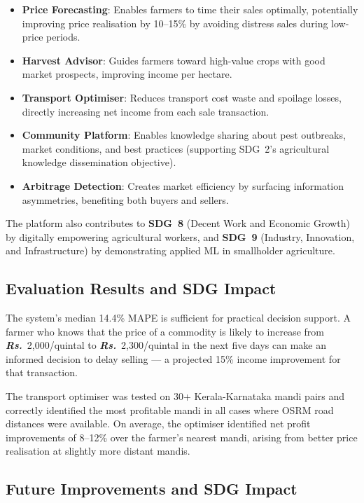 \documentclass[12pt,a4paper]{report}
\newcommand{\rupee}{\textrm{\textit{\textbf{Rs.}}}}
\begin{document}
\begin{itemize}
    \item \textbf{Price Forecasting}: Enables farmers to time their sales optimally,
    potentially improving price realisation by 10--15\% by avoiding distress sales
    during low-price periods.
    \item \textbf{Harvest Advisor}: Guides farmers toward high-value crops with good
    market prospects, improving income per hectare.
    \item \textbf{Transport Optimiser}: Reduces transport cost waste and spoilage losses,
    directly increasing net income from each sale transaction.
    \item \textbf{Community Platform}: Enables knowledge sharing about pest outbreaks,
    market conditions, and best practices (supporting SDG~2's agricultural knowledge
    dissemination objective).
    \item \textbf{Arbitrage Detection}: Creates market efficiency by surfacing
    information asymmetries, benefiting both buyers and sellers.
\end{itemize}

The platform also contributes to \textbf{SDG~8} (Decent Work and Economic Growth) by
digitally empowering agricultural workers, and \textbf{SDG~9} (Industry, Innovation, and
Infrastructure) by demonstrating applied ML in smallholder agriculture.

\subsection{Evaluation Results and SDG Impact}

The system's median 14.4\% MAPE is sufficient for practical decision support. A farmer
who knows that the price of a commodity is likely to increase from \rupee~2,000/quintal
to \rupee~2,300/quintal in the next five days can make an informed decision to delay
selling --- a projected 15\% income improvement for that transaction.

The transport optimiser was tested on 30+ Kerala-Karnataka mandi pairs and correctly
identified the most profitable mandi in all cases where OSRM road distances were available.
On average, the optimiser identified net profit improvements of 8--12\% over the farmer's
nearest mandi, arising from better price realisation at slightly more distant mandis.

\subsection{Future Improvements and SDG Impact}
\end{document}
